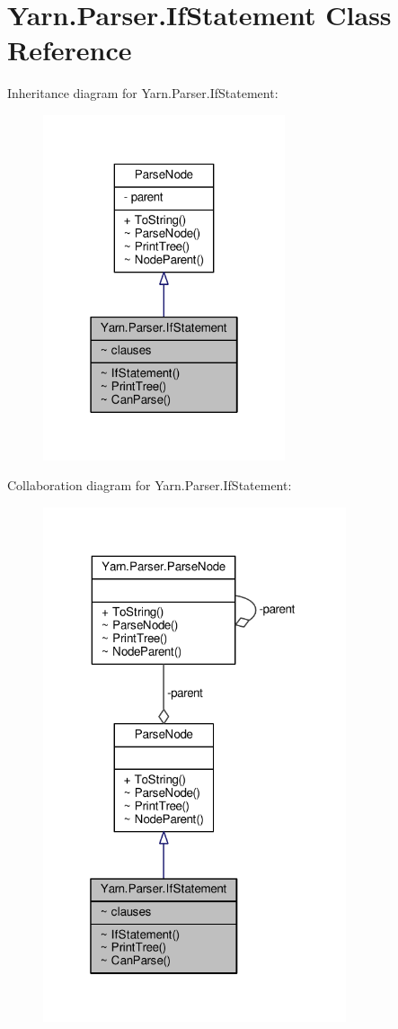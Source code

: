 \hypertarget{a00057}{\section{Yarn.\-Parser.\-If\-Statement Class Reference}
\label{a00057}
}


Inheritance diagram for Yarn.\-Parser.\-If\-Statement\-:
\nopagebreak
\begin{figure}[H]
\begin{center}
\leavevmode
\includegraphics[width=202pt]{a00288}
\end{center}
\end{figure}


Collaboration diagram for Yarn.\-Parser.\-If\-Statement\-:
\nopagebreak
\begin{figure}[H]
\begin{center}
\leavevmode
\includegraphics[width=253pt]{a00289}
\end{center}
\end{figure}
